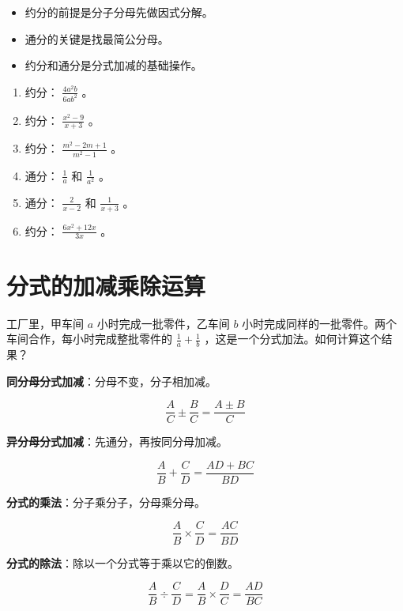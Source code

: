 \begin{keytakeaway}


\begin{itemize}
  \item 约分的前提是分子分母先做因式分解。
  \item 通分的关键是找最简公分母。
  \item 约分和通分是分式加减的基础操作。
\end{itemize}


\end{keytakeaway}

\begin{practice}


\begin{enumerate}
  \item 约分： $\frac{4a^2b}{6ab^2}$ 。
  \item 约分： $\frac{x^2 - 9}{x + 3}$ 。
  \item 约分： $\frac{m^2 - 2m + 1}{m^2 - 1}$ 。
  \item 通分： $\frac{1}{a}$ 和 $\frac{1}{a^2}$ 。
  \item 通分： $\frac{2}{x-2}$ 和 $\frac{1}{x+3}$ 。
  \item 约分： $\frac{6x^2 + 12x}{3x}$ 。
\end{enumerate}


\end{practice}

\section*{分式的加减乘除运算}


\begin{explore}


工厂里，甲车间 $a$ 小时完成一批零件，乙车间 $b$ 小时完成同样的一批零件。两个车间合作，每小时完成整批零件的 $\frac{1}{a} + \frac{1}{b}$ ，这是一个分式加法。如何计算这个结果？

\end{explore}

\begin{understand}


\textbf{同分母分式加减}：分母不变，分子相加减。

\[
\frac{A}{C} \pm \frac{B}{C} = \frac{A \pm B}{C}
\]


\textbf{异分母分式加减}：先通分，再按同分母加减。

\[
\frac{A}{B} + \frac{C}{D} = \frac{AD + BC}{BD}
\]


\textbf{分式的乘法}：分子乘分子，分母乘分母。

\[
\frac{A}{B} \times \frac{C}{D} = \frac{AC}{BD}
\]


\textbf{分式的除法}：除以一个分式等于乘以它的倒数。

\[
\frac{A}{B} \div \frac{C}{D} = \frac{A}{B} \times \frac{D}{C} = \frac{AD}{BC}
\]


\end{understand}

